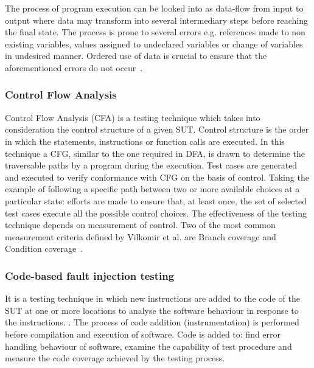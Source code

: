 The process of program execution can be looked into as data-flow from input to output where data may transform into several intermediary steps before reaching the final state. The process is prone to several errors e.g. references made to non existing variables, values assigned to undeclared variables or change of variables in undesired manner. Ordered use of data is crucial to ensure that the aforementioned errors do not occur~\cite{fosdick1976data}.

\subsubsection{Control Flow Analysis}
Control Flow Analysis (CFA) is a testing technique which takes into consideration the control structure of a given SUT. Control structure is the order in which the statements, instructions or function calls are executed. In this technique a CFG, similar to the one required in DFA, is drawn to determine the traversable paths by a program during the execution. Test cases are generated and executed to verify conformance with CFG on the basis of control. Taking the example of following a specific path between two or more available choices at a particular state: efforts are made to ensure that, at least once, the set of selected test cases execute all the possible control choices. The effectiveness of the testing technique depends on measurement of control. Two of the most common measurement criteria defined by Vilkomir et al. are Branch coverage and Condition coverage~\cite{vilkomir2003tolerance}. 

\subsubsection{Code-based fault injection testing}
It is a testing technique in which new instructions are added to the code of the SUT at one or more locations to analyse the software behaviour in response to the instructions. \cite{voas1997software}. The process of code addition (instrumentation) is performed before compilation and execution of software. Code is added to: find error handling behaviour of software, examine the capability of test procedure and measure the code coverage achieved by the testing process.    

